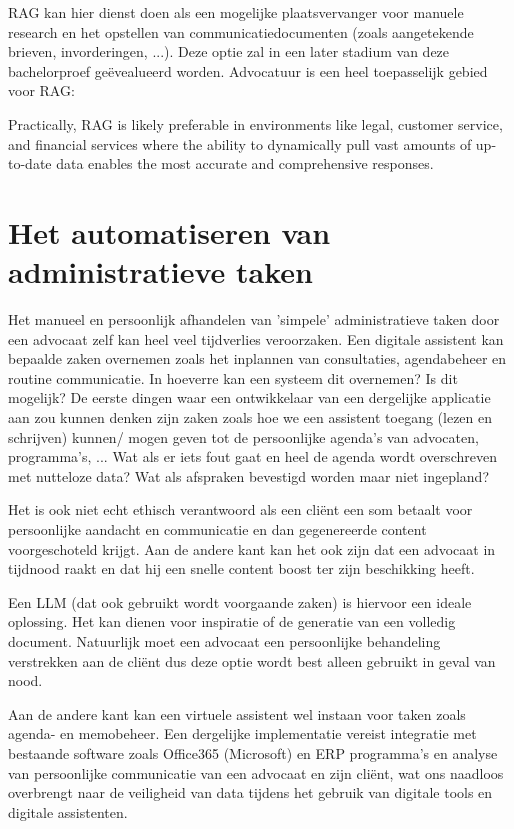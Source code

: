 RAG kan hier dienst doen als een mogelijke plaatsvervanger voor manuele research en het opstellen van communicatiedocumenten (zoals aangetekende brieven, invorderingen, ...). Deze optie zal in
een later stadium van deze bachelorproef geëvealueerd worden. Advocatuur is een heel toepasselijk gebied voor RAG:

\begin{displayquote}
	Practically, RAG is likely preferable in environments like
	legal, customer service, and financial services where the ability to
	dynamically pull vast amounts of up-to-date data enables the most accurate and comprehensive responses.
\end{displayquote}

\section{Het automatiseren van administratieve taken}
Het manueel en persoonlijk afhandelen van 'simpele' administratieve taken door een advocaat zelf kan heel veel tijdverlies veroorzaken. Een digitale assistent kan bepaalde zaken
overnemen zoals het inplannen van consultaties, agendabeheer en routine		communicatie. In hoeverre kan een systeem dit overnemen? Is dit mogelijk? 
De eerste dingen waar een ontwikkelaar van een dergelijke applicatie aan zou kunnen denken zijn zaken zoals hoe we een assistent toegang (lezen en schrijven) kunnen/ mogen geven tot 
de persoonlijke agenda's van advocaten, programma's, ... Wat als er iets fout gaat en heel de agenda wordt overschreven met nutteloze data? Wat als afspraken bevestigd worden maar niet ingepland? 

Het is ook niet echt ethisch verantwoord als een cliënt een som betaalt voor persoonlijke aandacht en communicatie en dan gegenereerde content voorgeschoteld krijgt. 
Aan de andere kant kan het ook zijn dat een advocaat in tijdnood raakt en dat hij een snelle content boost ter zijn beschikking heeft. 

Een LLM (dat ook gebruikt wordt voorgaande zaken) is hiervoor een ideale oplossing. Het kan dienen voor inspiratie of de generatie van een volledig document. Natuurlijk moet
een advocaat een persoonlijke behandeling verstrekken aan de cliënt dus deze optie wordt best alleen gebruikt in geval van nood. 

Aan de andere kant kan een virtuele assistent wel instaan voor taken zoals agenda- en memobeheer. 
Een dergelijke implementatie vereist integratie met bestaande software zoals Office365 (Microsoft) en ERP programma's en analyse van persoonlijke communicatie van een advocaat en zijn cliënt,
wat ons naadloos overbrengt naar de veiligheid van data tijdens het gebruik van digitale tools en digitale assistenten. 

